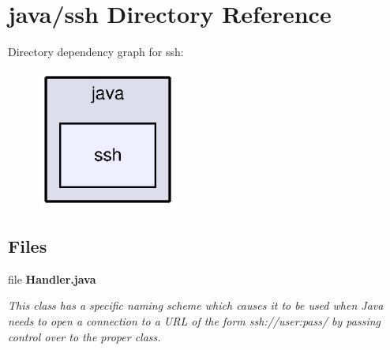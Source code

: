 \section{java/ssh Directory Reference}
\label{dir_78f1eca83964fe61d8b36350cd844585}
Directory dependency graph for ssh\+:\nopagebreak
\begin{figure}[H]
\begin{center}
\leavevmode
\includegraphics[width=130pt]{dir_78f1eca83964fe61d8b36350cd844585_dep}
\end{center}
\end{figure}
\subsection*{Files}
\begin{DoxyCompactItemize}
\item 
file {\bf Handler.\+java}
\begin{DoxyCompactList}\small\item\em This class has a specific naming scheme which causes it to be used when Java needs to open a connection to a U\+R\+L of the form ssh\+://user\+:pass/ by passing control over to the proper class. \end{DoxyCompactList}\end{DoxyCompactItemize}
